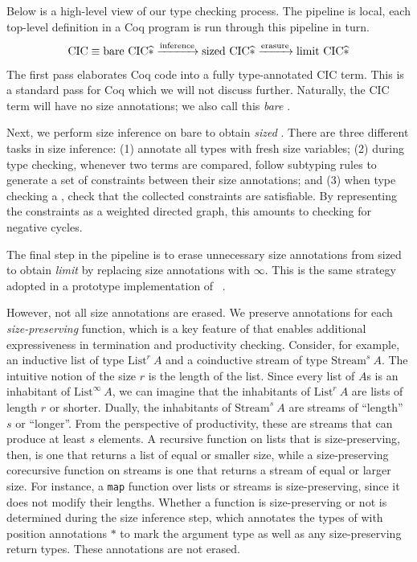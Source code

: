 Below is a high-level view of our type checking process.
The pipeline is local, \ie each top-level definition in a Coq program is run through this pipeline in turn.
\begin{equation*}
  \text{CIC} \equiv \text{bare CIC$\widehat{\ast}$} \xrightarrow{\text{inference}} \text{sized CIC$\widehat{\ast}$} \xrightarrow{\text{erasure}} \text{limit CIC$\widehat{\ast}$}
\end{equation*}

The first pass elaborates Coq code into a fully type-annotated CIC term.
This is a standard pass for Coq which we will not discuss further.
Naturally, the CIC term will have no size annotations; we also call this \emph{bare} \lang.

Next, we perform size inference on bare \lang to obtain \emph{sized} \lang.
There are three different tasks in size inference: (1) annotate all \coinductive types with fresh size variables; (2) during type checking, whenever two terms are compared, follow subtyping rules to generate a set of constraints between their size annotations; and (3) when type checking a \cofixpoint, check that the collected constraints are satisfiable.
By representing the constraints as a weighted directed graph, this amounts to checking for negative cycles.

The final step in the pipeline is to erase unnecessary size annotations from sized \lang to obtain \emph{limit} \lang by replacing size annotations with $\infty$.
This is the same strategy adopted in a prototype implementation of \CIChatminus~\citep{cicminus}.

However, not all size annotations are erased.
We preserve annotations for each \emph{size-preserving} \corecursive function, which is a key feature of \lang that enables additional expressiveness in termination and productivity checking.
Consider, for example, an inductive list of type $\text{List}^r ~ A$ and a coinductive stream of type $\text{Stream}^s ~ A$.
The intuitive notion of the size $r$ is the length of the list.
Since every list of $A$s is an inhabitant of $\text{List}^\infty ~ A$, we can imagine that the inhabitants of $\text{List}^r ~ A$ are lists of length $r$ or shorter.
Dually, the inhabitants of $\text{Stream}^s ~ A$ are streams of ``length'' $s$ or ``longer''.
From the perspective of productivity, these are streams that can produce at least $s$ elements.
A recursive function on lists that is size-preserving, then, is one that returns a list of equal or smaller size, while a size-preserving corecursive function on streams is one that returns a stream of equal or larger size.
For instance, a \texttt{map} function over lists or streams is size-preserving, since it does not modify their lengths.
Whether a \corecursive function is size-preserving or not is determined during the size inference step, which annotates the types of \cofixpoints with position annotations $*$ to mark the \corecursive argument type as well as any size-preserving return types.
These annotations are not erased.

